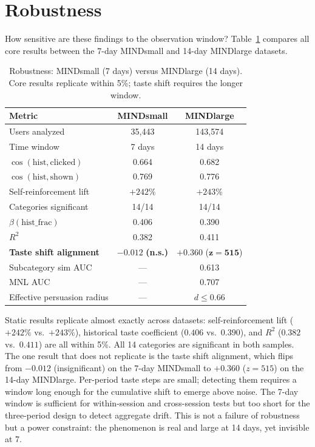 \documentclass[11pt]{article}
\begin{document}
\section{Robustness}

How sensitive are these findings to the observation window? Table~\ref{tab:robustness} compares all core results between the 7-day MINDsmall and 14-day MINDlarge datasets.

\begin{table}[ht]
\centering
\caption{Robustness: MINDsmall (7 days) versus MINDlarge (14 days). Core results replicate within 5\%; taste shift requires the longer window.}
\label{tab:robustness}
\begin{tabular}{lcc}
\toprule
Metric & MINDsmall & MINDlarge \\
\midrule
Users analyzed & 35,443 & 143,574 \\
Time window & 7 days & 14 days \\
$\cos(\text{hist}, \text{clicked})$ & 0.664 & 0.682 \\
$\cos(\text{hist}, \text{shown})$ & 0.769 & 0.776 \\
Self-reinforcement lift & $+242\%$ & $+243\%$ \\
Categories significant & 14/14 & 14/14 \\
$\beta(\text{hist\_frac})$ & 0.406 & 0.390 \\
$R^2$ & 0.382 & 0.411 \\
\textbf{Taste shift alignment} & $\boldsymbol{-0.012}$ \textbf{(n.s.)} & $\boldsymbol{+0.360}$ ($\boldsymbol{z = 515}$) \\
Subcategory sim AUC & --- & 0.613 \\
MNL AUC & --- & 0.707 \\
Effective persuasion radius & --- & $d \leq 0.66$ \\
\bottomrule
\end{tabular}
\end{table}
\FloatBarrier

Static results replicate almost exactly across datasets: self-reinforcement lift ($+242\%$ vs.\ $+243\%$), historical taste coefficient ($0.406$ vs.\ $0.390$), and $R^2$ ($0.382$ vs.\ $0.411$) are all within 5\%. All 14 categories are significant in both samples. The one result that does not replicate is the taste shift alignment, which flips from $-0.012$ (insignificant) on the 7-day MINDsmall to $+0.360$ ($z = 515$) on the 14-day MINDlarge. Per-period taste steps are small; detecting them requires a window long enough for the cumulative shift to emerge above noise. The 7-day window is sufficient for within-session and cross-session tests but too short for the three-period design to detect aggregate drift. This is not a failure of robustness but a power constraint: the phenomenon is real and large at 14 days, yet invisible at 7.
\end{document}
